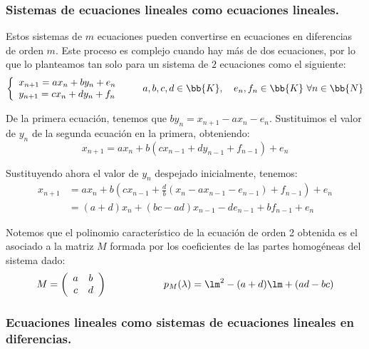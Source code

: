 \subsubsection{Sistemas de ecuaciones lineales como ecuaciones lineales.}
Estos sistemas de $m$ ecuaciones pueden convertirse en ecuaciones en diferencias de orden $m$. Este proceso es complejo cuando hay más de dos ecuaciones, por lo que lo planteamos tan solo para un sistema de $2$ ecuaciones como el siguiente:
\begin{equation*}
    \left\{ \begin{array}{l}
        x_{n+1} = ax_n + by_n + e_n\\
        y_{n+1} = cx_n + dy_n + f_n\\
    \end{array}\right. \qquad
    a,b,c,d\in \bb{K},\quad e_n,f_n\in \bb{K}~\forall n\in \bb{N}
\end{equation*}

De la primera ecuación, tenemos que $by_n = x_{n+1}-ax_n-e_n$. Sustituimos el valor de $y_n$ de la segunda ecuación en la primera, obteniendo:
\begin{equation*}
    x_{n+1} = ax_n + b\left(cx_{n-1} + dy_{n-1} + f_{n-1}\right) + e_n
\end{equation*}

Sustituyendo ahora el valor de $y_n$ despejado inicialmente, tenemos:
\begin{align*}
    x_{n+1} &= ax_n + b\left(cx_{n-1} + \frac{d}{b}\left(x_{n}-ax_{n-1}-e_{n-1}\right) + f_{n-1}\right) + e_n\\
    &= (a+d)x_n + (bc-ad)x_{n-1} -de_{n-1} +bf_{n-1} + e_n
\end{align*}

Notemos que el polinomio característico de la ecuación de orden 2 obtenida es el asociado a la matriz $M$ formada por los coeficientes de las partes homogéneas del sistema dado:
\begin{equation*}
    M = \left(\begin{array}{cccc}
        a & b\\
        c & d
    \end{array} \right) \hspace{2cm} p_M(\lambda) = \lm^2-(a+d)\lm +(ad-bc)
\end{equation*}

\subsubsection{Ecuaciones lineales como sistemas de ecuaciones lineales en diferencias.}

